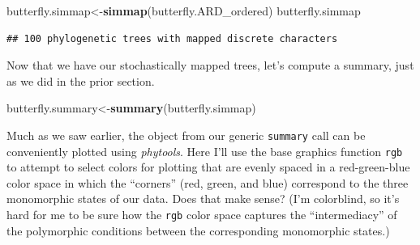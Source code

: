 \documentclass[fleqn,10pt,lineno]{wlpeerj} %
\newenvironment{Shaded}{\begin{snugshade}}{\end{snugshade}}
\newcommand{\FunctionTok}[1]{\textcolor[rgb]{0.13,0.29,0.53}{\textbf{#1}}}
\newcommand{\NormalTok}[1]{#1}
\newcommand{\OtherTok}[1]{\textcolor[rgb]{0.56,0.35,0.01}{#1}}
\begin{document}
\begin{Shaded}
\begin{Highlighting}[]
\NormalTok{butterfly.simmap}\OtherTok{\textless{}{-}}\FunctionTok{simmap}\NormalTok{(butterfly.ARD\_ordered)}
\NormalTok{butterfly.simmap}
\end{Highlighting}
\end{Shaded}

\begin{verbatim}
## 100 phylogenetic trees with mapped discrete characters
\end{verbatim}

Now that we have our stochastically mapped trees, let's compute a summary, just as we did in the prior section.

\begin{Shaded}
\begin{Highlighting}[]
\NormalTok{butterfly.summary}\OtherTok{\textless{}{-}}\FunctionTok{summary}\NormalTok{(butterfly.simmap)}
\end{Highlighting}
\end{Shaded}

Much as we saw earlier, the object from our generic \texttt{summary} call can be conveniently plotted using \emph{phytools}. Here I'll use the base graphics function \texttt{rgb} to attempt to select colors for plotting that are evenly spaced in a red-green-blue color space in which the ``corners'' (red, green, and blue) correspond to the three monomorphic states of our data. Does that make sense? (I'm colorblind, so it's hard for me to be sure how the \texttt{rgb} color space captures the ``intermediacy'' of the polymorphic conditions between the corresponding monomorphic states.)
\end{document}
